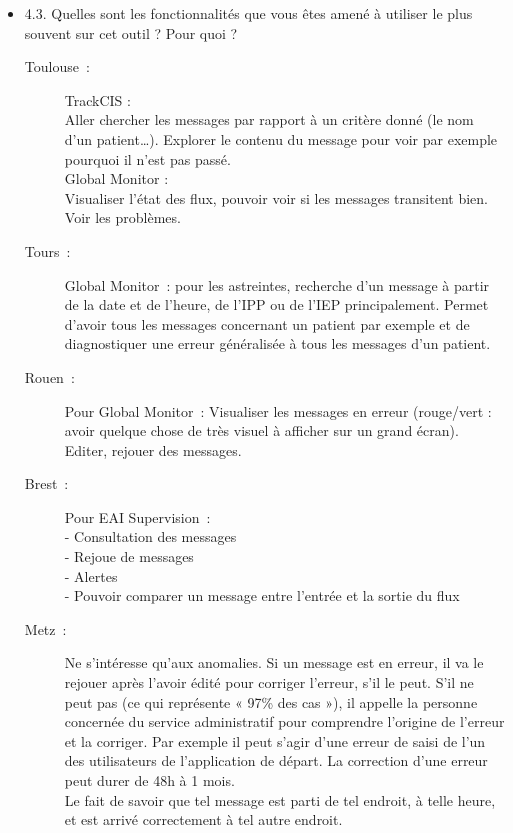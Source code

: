 \begin{itemize}
	  \item 4.3. Quelles sont les fonctionnalités que vous êtes amené à utiliser le
	  plus souvent sur cet outil ? Pour quoi ?
	  \begin{description}
	  	\item[Toulouse~:] TrackCIS :\\
		Aller chercher les messages par rapport à un critère donné (le nom d’un patient…).
		Explorer le contenu du message pour voir par exemple pourquoi il n’est pas
		passé.\\
		Global Monitor :\\
		Visualiser l’état des flux, pouvoir voir si les messages transitent bien.
		Voir les problèmes.
	  	\item[Tours~:] Global Monitor~: pour les astreintes, recherche
	  	d’un message à partir de la date et de l’heure, de l’IPP ou de l’IEP principalement.
	  	Permet d’avoir tous les messages concernant un patient par exemple et de
	  	diagnostiquer une erreur généralisée à tous les messages d’un patient.
	  	\item[Rouen~:] Pour Global Monitor~:
		Visualiser les messages en erreur (rouge/vert : avoir quelque chose de très
		visuel à afficher sur un grand écran).\\
		Editer, rejouer des messages.
	  	\item[Brest~:] Pour EAI Supervision~:\\
	  	- Consultation des messages\\
		- Rejoue de messages\\
		- Alertes\\
		- Pouvoir comparer un message entre l’entrée et la sortie du flux
	  	\item[Metz~:] Ne s’intéresse qu’aux anomalies. Si un message est en erreur,
	  	il va le rejouer après l’avoir édité pour corriger l’erreur, s’il le peut.
	  	S’il ne peut pas (ce qui représente « 97\% des cas »), il appelle la
	  	personne concernée du service administratif pour comprendre l’origine de l’erreur
	  	et la corriger. Par exemple il peut s’agir d’une erreur de saisi de l’un
	  	des utilisateurs de l’application de départ. La correction d’une erreur
	  	peut durer de 48h à 1 mois.\\
		Le fait de savoir que tel message est parti de tel endroit, à telle heure, et
		est arrivé correctement à tel autre endroit.
	  \end{description}
	  

\end{itemize}

